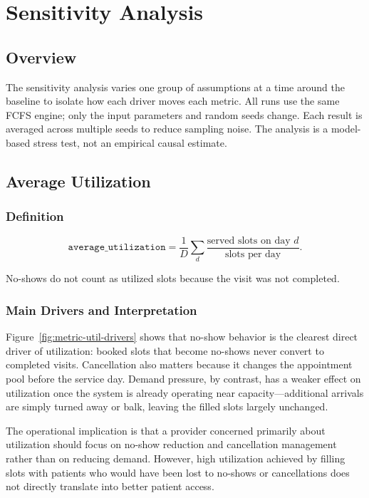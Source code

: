 \documentclass[11pt]{article}
\begin{document}
\section{Sensitivity Analysis}
\label{sec:sensitivity}

\subsection{Overview}

The sensitivity analysis varies one group of assumptions at a time around the
baseline to isolate how each driver moves each metric. All runs use the same
FCFS engine; only the input parameters and random seeds change. Each result
is averaged across multiple seeds to reduce sampling noise. The analysis is a
model-based stress test, not an empirical causal estimate.

\subsection{Average Utilization}

\subsubsection*{Definition}

\[
\texttt{average\_utilization} =
\frac{1}{D}\sum_d \frac{\text{served slots on day } d}{\text{slots per day}}.
\]

No-shows do not count as utilized slots because the visit was not completed.

\subsubsection*{Main Drivers and Interpretation}

Figure~\ref{fig:metric-util-drivers} shows that no-show behavior is the
clearest direct driver of utilization: booked slots that become no-shows
never convert to completed visits. Cancellation also matters because it
changes the appointment pool before the service day. Demand pressure, by
contrast, has a weaker effect on utilization once the system is already
operating near capacity---additional arrivals are simply turned away or balk,
leaving the filled slots largely unchanged.

The operational implication is that a provider concerned primarily about
utilization should focus on no-show reduction and cancellation management
rather than on reducing demand. However, high utilization achieved by filling
slots with patients who would have been lost to no-shows or cancellations does
not directly translate into better patient access.
\end{document}
